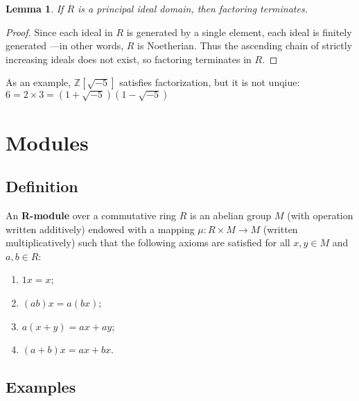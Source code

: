 \documentclass[11pt]{article}
\newtheorem{lemma}{Lemma}
\begin{document}
\begin{adjustwidth}{0.5cm}{}
  \begin{lemma}
    If $R$ is a principal ideal domain, then factoring terminates.
  \end{lemma}
  \begin{proof}
    Since each ideal in $R$ is generated by a single element, each ideal is finitely generated ---in other words, $R$ is Noetherian. Thus the ascending chain of strictly increasing ideals does not exist, so factoring terminates in $R$.
  \end{proof}
\end{adjustwidth}

As an example, $\mathbb{Z} [\sqrt{-5}]$ satisfies factorization, but it is not unqiue: $6 = 2 \times 3 = (1 + \sqrt{-5})(1 - \sqrt{-5})$

\newpage


\section{Modules}


\subsection{Definition}

An \textbf{R-module} over a commutative ring $R$ is an abelian group $M$ (with operation written additively) endowed with a mapping $\mu : R \times M \to M$ (written multiplicatively) such that the following axioms are satisfied for all $x, y \in M$ and $a, b \in R$:
\begin{enumerate}
	\item $1x = x$;
	\item $(ab)x = a(bx)$;
	\item $a(x + y) = ax + ay$;
	\item $(a + b)x = ax + bx$.
\end{enumerate}


\subsection{Examples}
\end{document}
